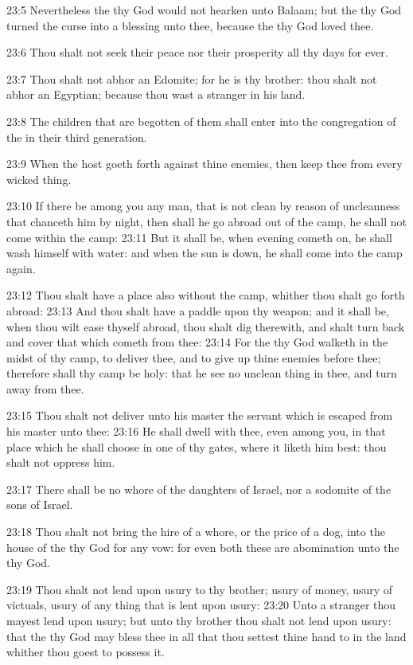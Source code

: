 23:5 Nevertheless the \LORD thy God would not hearken unto Balaam; but the \LORD thy God turned the curse into a blessing unto thee, because the \LORD thy God loved thee.

23:6 Thou shalt not seek their peace nor their prosperity all thy days for ever.

23:7 Thou shalt not abhor an Edomite; for he is thy brother: thou shalt not abhor an Egyptian; because thou wast a stranger in his land.

23:8 The children that are begotten of them shall enter into the congregation of the \LORD in their third generation.

23:9 When the host goeth forth against thine enemies, then keep thee from every wicked thing.

23:10 If there be among you any man, that is not clean by reason of uncleanness that chanceth him by night, then shall he go abroad out of the camp, he shall not come within the camp: 23:11 But it shall be, when evening cometh on, he shall wash himself with water: and when the sun is down, he shall come into the camp again.

23:12 Thou shalt have a place also without the camp, whither thou shalt go forth abroad: 23:13 And thou shalt have a paddle upon thy weapon; and it shall be, when thou wilt ease thyself abroad, thou shalt dig therewith, and shalt turn back and cover that which cometh from thee: 23:14 For the \LORD thy God walketh in the midst of thy camp, to deliver thee, and to give up thine enemies before thee; therefore shall thy camp be holy: that he see no unclean thing in thee, and turn away from thee.

23:15 Thou shalt not deliver unto his master the servant which is escaped from his master unto thee: 23:16 He shall dwell with thee, even among you, in that place which he shall choose in one of thy gates, where it liketh him best: thou shalt not oppress him.

23:17 There shall be no whore of the daughters of Israel, nor a sodomite of the sons of Israel.

23:18 Thou shalt not bring the hire of a whore, or the price of a dog, into the house of the \LORD thy God for any vow: for even both these are abomination unto the \LORD thy God.

23:19 Thou shalt not lend upon usury to thy brother; usury of money, usury of victuals, usury of any thing that is lent upon usury: 23:20 Unto a stranger thou mayest lend upon usury; but unto thy brother thou shalt not lend upon usury: that the \LORD thy God may bless thee in all that thou settest thine hand to in the land whither thou goest to possess it.

